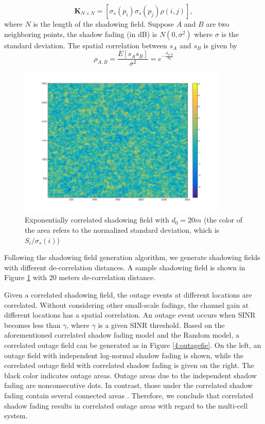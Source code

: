  \begin{equation}
 \mathbf{K}_{N\times N} = [ \sigma_{s}(p_{i})\sigma_{s}(p_{j})\rho(i,j)],
 \label{correlationmatrix}
 \end{equation}
 where $N$ is the length of the shadowing field. Suppose $A$ and $B$ are two neighboring points, the shadow fading (in dB) is $N(0,\sigma^2)$ where $\sigma$ is the standard deviation. The spatial correlation between $s_{A}$ and $s_{B}$ is given by 
 \begin{equation}
 \rho_{A,B} = \frac{E[s_{A}s_{B}]}{\sigma^2} =e^{-\frac{d_{A,B}}{d_{0}}}
 \end{equation}
 \begin{figure}
 \centering
 \includegraphics[width = 10cm]{ShadowFieldDeCorr20.jpg}
 \caption{Exponentially correlated shadowing field with $d_{0} = 20m$ (the color of the area refers to the normalized standard deviation, which is $S_{i}/\sigma_{s}(i)$)}

 \label{ch4:shadowingfield}
 \end{figure}

 Following the shadowing field generation algorithm, we generate shadowing fields with different de-correlation distances. A sample shadowing field is shown in Figure \ref{ch4:shadowingfield} with 20 meters de-correlation distance.

 \par Given a correlated shadowing field, the outage events at different locations are correlated. Without considering other small-scale fadings, the channel gain at different locations has a spatial correlation. An outage event occurs when SINR becomes less than $\gamma$, where $\gamma$ is a given SINR threshold. Based on the aforementioned correlated shadow fading model and the Random model, a correlated outage field can be generated as in Figure \ref{4:outagefie}. On the left, an outage field with independent log-normal shadow fading is shown, while the correlated outage field with correlated shadow fading is given on the right. The black color indicates outage areas. Outage areas due to the independent shadow fading are nonconsecutive dots. In contrast, those under the correlated shadow fading contain several connected areas . Therefore, we conclude that correlated shadow fading results in correlated outage areas with regard to the multi-cell system.

